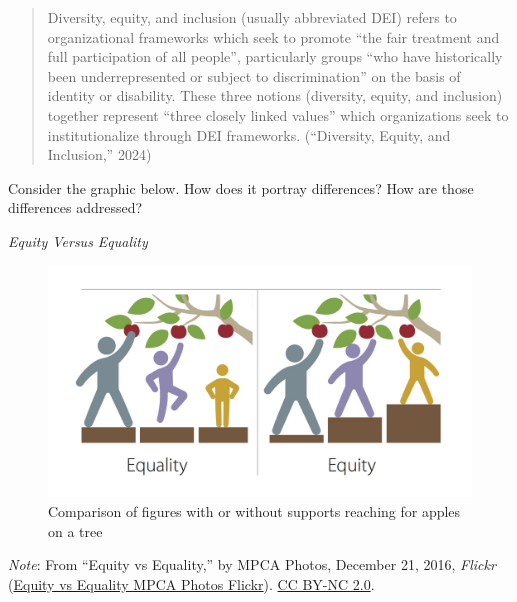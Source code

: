 \documentclass[
  letterpaper,
  DIV=11,
  numbers=noendperiod]{scrreprt}
\begin{document}
\begin{quote}
Diversity, equity, and inclusion (usually abbreviated DEI) refers to
organizational frameworks which seek to promote ``the fair treatment and
full participation of all people'', particularly groups ``who have
historically been underrepresented or subject to discrimination'' on the
basis of identity or disability. These three notions (diversity, equity,
and inclusion) together represent ``three closely linked values'' which
organizations seek to institutionalize through DEI frameworks.
(``Diversity, Equity, and Inclusion,'' 2024)
\end{quote}

Consider the graphic below. How does it portray differences? How are
those differences addressed?

\emph{Equity Versus Equality}

\begin{figure}

\caption{\label{fig-31655988501x979c7b1c82}Comparison of figures with or
without supports reaching for apples on a tree}

\includegraphics{assets/u6/Equity_vs_Equality.jpg}

\end{figure}%

\begin{tcolorbox}[enhanced jigsaw, toprule=.15mm, colback=white, colframe=quarto-callout-note-color-frame, arc=.35mm, opacityback=0, breakable, rightrule=.15mm, bottomrule=.15mm, leftrule=.75mm, left=2mm]
\begin{minipage}[t]{5.5mm}
\textcolor{quarto-callout-note-color}{\faInfo}
\end{minipage}%
\begin{minipage}[t]{\textwidth - 5.5mm}

\emph{Note}: From ``Equity vs Equality,'' by MPCA Photos, December 21,
2016, \emph{Flickr}
(\href{https://flickr.com/photos/mpcaphotos/31655988501/}{Equity vs
Equality \textbar{} MPCA Photos \textbar{} Flickr}).
\href{https://creativecommons.org/licenses/by-nc/2.0/}{CC BY-NC 2.0}.

\end{minipage}%
\end{tcolorbox}
\end{document}
